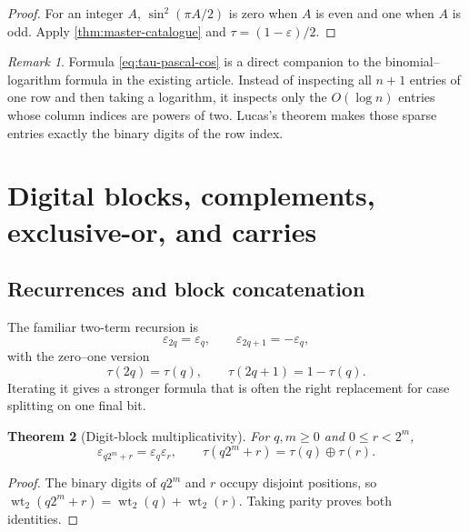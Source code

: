 \documentclass[11pt,oneside]{article}
\newtheorem{theorem}{Theorem}[section]
\theoremstyle{definition}
\theoremstyle{remark}
\newtheorem{remark}[theorem]{Remark}
\newcommand{\wt}{\operatorname{wt}_2}
\newcommand{\xor}{\mathbin{\oplus}}
\begin{document}
\begin{proof}
For an integer \(A\), \(\sin^2(\pi A/2)\) is zero when \(A\) is even and one
when \(A\) is odd.  Apply \cref{thm:master-catalogue} and
\(\tau=(1-\varepsilon)/2\).
\end{proof}

\begin{remark}
Formula \eqref{eq:tau-pascal-cos} is a direct companion to the
binomial--logarithm formula in the existing article.  Instead of inspecting
all \(n+1\) entries of one row and then taking a logarithm, it inspects only
the \(O(\log n)\) entries whose column indices are powers of two.  Lucas's
theorem makes those sparse entries exactly the binary digits of the row
index.
\end{remark}

\section{Digital blocks, complements, exclusive-or, and carries}
\label{sec:digital}

\subsection{Recurrences and block concatenation}

The familiar two-term recursion is
\begin{equation}
 \varepsilon_{2q}=\varepsilon_q,
 \qquad
 \varepsilon_{2q+1}=-\varepsilon_q,
 \label{eq:evenodd-sign}
\end{equation}
with the zero--one version
\begin{equation}
 \tau(2q)=\tau(q),
 \qquad
 \tau(2q+1)=1-\tau(q).
 \label{eq:evenodd-bit}
\end{equation}
Iterating it gives a stronger formula that is often the right replacement for
case splitting on one final bit.

\begin{theorem}[Digit-block multiplicativity]
\label{thm:block-multiplicativity}
For \(q,m\ge0\) and \(0\le r<2^m\),
\begin{equation}
 \varepsilon_{q2^m+r}=\varepsilon_q\varepsilon_r,
 \qquad
 \tau(q2^m+r)=\tau(q)\xor\tau(r).
 \label{eq:block-multiplicativity}
\end{equation}
\end{theorem}

\begin{proof}
The binary digits of \(q2^m\) and \(r\) occupy disjoint positions, so
\(\wt(q2^m+r)=\wt(q)+\wt(r)\).  Taking parity proves both identities.
\end{proof}
\end{document}
